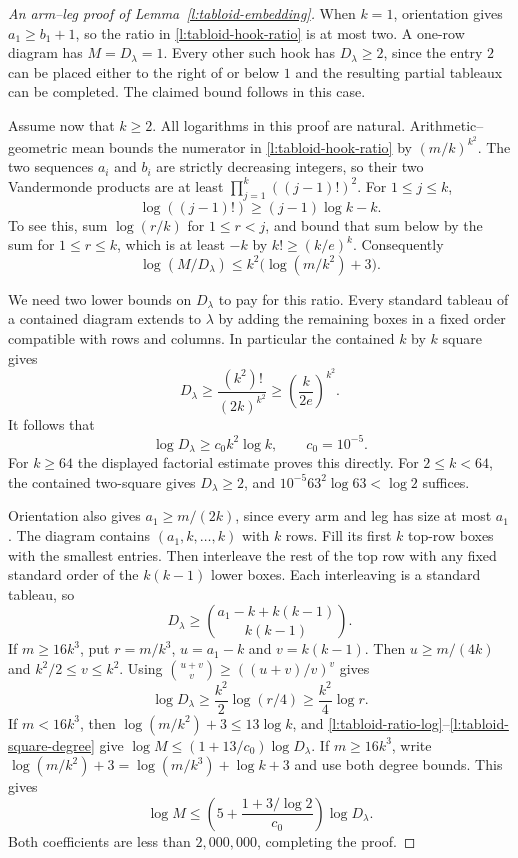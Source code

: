 \begin{proof}[An arm--leg proof of Lemma~\ref{l:tabloid-embedding}]
When $k=1$, orientation gives $a_1\ge b_1+1$, so the ratio in
\eqref{l:tabloid-hook-ratio} is at most two.  A one-row diagram has
$M=D_\lambda=1$.  Every other such hook has $D_\lambda\ge2$, since
the entry $2$ can be placed either to the right of or below $1$ and
the resulting partial tableaux can be completed.  The claimed bound
follows in this case.

Assume now that $k\ge2$.  All logarithms in this proof are natural.
Arithmetic--geometric mean bounds the numerator in
\eqref{l:tabloid-hook-ratio} by $(m/k)^{k^2}$.  The two sequences
$a_i$ and $b_i$ are strictly decreasing integers, so their two
Vandermonde products are at least
$\prod_{j=1}^k((j-1)!)^2$.  For $1\le j\le k$,
\[
 \log((j-1)!)\ge (j-1)\log k-k.
\]
To see this, sum $\log(r/k)$ for $1\le r<j$, and bound that sum
below by the sum for $1\le r\le k$, which is at least $-k$ by
$k!\ge(k/e)^k$.  Consequently
\begin{equation}
 \log(M/D_\lambda)
 \le k^2\bigl(\log(m/k^2)+3\bigr).
 \label{l:tabloid-ratio-log}
\end{equation}

We need two lower bounds on $D_\lambda$ to pay for this ratio.
Every standard tableau of a contained diagram extends to $\lambda$
by adding the remaining boxes in a fixed order compatible with rows
and columns.  In particular the contained $k$ by $k$ square gives
\[
 D_\lambda\ge\frac{(k^2)!}{(2k)^{k^2}}
             \ge\left(\frac{k}{2e}\right)^{k^2}.
\]
It follows that
\begin{equation}
 \log D_\lambda\ge c_0 k^2\log k,
 \qquad c_0=10^{-5}.
 \label{l:tabloid-square-degree}
\end{equation}
For $k\ge64$ the displayed factorial estimate proves this directly.
For $2\le k<64$, the contained two-square gives $D_\lambda\ge2$,
and $10^{-5}63^2\log63<\log2$ suffices.

Orientation also gives $a_1\ge m/(2k)$, since every arm and leg has
size at most $a_1$.  The diagram contains $(a_1,k,\ldots,k)$ with
$k$ rows.  Fill its first $k$ top-row boxes with the smallest entries.
Then interleave the rest of the top row with any fixed standard order
of the $k(k-1)$ lower boxes.  Each interleaving is a standard tableau,
so
\[
 D_\lambda\ge
 \binom{a_1-k+k(k-1)}{k(k-1)}.
\]
If $m\ge16k^3$, put $r=m/k^3$, $u=a_1-k$ and $v=k(k-1)$.
Then $u\ge m/(4k)$ and $k^2/2\le v\le k^2$.  Using
$\binom{u+v}{v}\ge((u+v)/v)^v$ gives
\begin{equation}
 \log D_\lambda
 \ge\frac{k^2}{2}\log(r/4)
 \ge\frac{k^2}{4}\log r.
 \label{l:tabloid-long-arm-degree}
\end{equation}
If $m<16k^3$, then $\log(m/k^2)+3\le13\log k$, and
\eqref{l:tabloid-ratio-log}--\eqref{l:tabloid-square-degree} give
$\log M\le(1+13/c_0)\log D_\lambda$.
If $m\ge16k^3$, write
$\log(m/k^2)+3=\log(m/k^3)+\log k+3$ and use both degree bounds.
This gives
\[
 \log M\le
 \left(5+\frac{1+3/\log2}{c_0}\right)\log D_\lambda.
\]
Both coefficients are less than $2{,}000{,}000$, completing the proof.
\end{proof}


